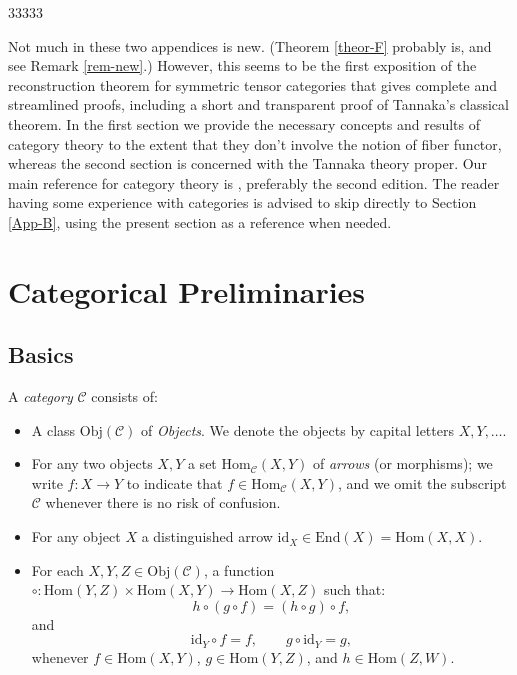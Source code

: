 \documentclass[11pt]{article}
\newcommand{\ip}[2]{\langle #1,#2\rangle}
\theoremstyle{definition}
\theoremstyle{definition}
\theoremstyle{remark}
\newcommand{\restr}{\upharpoonright}
\newcommand{\oli}{{\overline{\imath}}}
\newcommand{\DS}{\displaystyle}
\newcommand{\Obj}{\mathrm{Obj}}
\newcommand{\op}{{\mbox{\scriptsize op}}}
\newcommand{\impl}{\Rightarrow}
\newcommand{\ve}{\varepsilon}
\def\2#1{{\mathcal #1}}
\newcommand{\Hom}{\mathrm{Hom}}
\newcommand{\End}{\mathrm{End}}
\newcommand{\rarr}{\rightarrow}
\def\id{\mathrm{id}}
\begin{document}
\def\implies{\Rightarrow}
\renewcommand{\restr}{\upharpoonright}
\renewcommand{\rarr}{\rightarrow}
\newcommand{\lrarr}{\longrightarrow}
\renewcommand{\impl}{\Rightarrow}
\renewcommand{\oli}{{\overline{\imath}}}
\renewcommand{\ve}{\varepsilon}
\renewcommand{\op}{{\mbox{\scriptsize op}}}

\renewcommand{\DS}{\displaystyle}

\def\ip#1#2{{(\,#1\, , \, #2\,)}}
\def\m#1{{\vert #1 \vert}} \def\n#1{\Vert #1 \Vert}
\def\prf{\noindent \emph{Proof.\ }}

 33333

\vspace{2em} \noindent Not much in these two appendices
is new. (Theorem \ref{theor-F} probably is, and see
Remark \ref{rem-new}.) However, this seems to be the
first exposition of the reconstruction theorem for
symmetric tensor categories that gives complete and
streamlined proofs, including a short and transparent
proof of Tannaka's classical theorem. In the first
section we provide the necessary concepts and results
of category theory to the extent that they don't
involve the notion of fiber functor, whereas the second
section is concerned with the Tannaka theory
proper. Our main reference for category theory is
\cite{cwm}, preferably the second edition. The reader
having some experience with categories is advised to
skip directly to Section \ref{App-B}, using the present
section as a reference when needed.


\section{Categorical Preliminaries} \label{cats} \label{app-A}

\subsection{Basics}
\bdefin \label{def-cat} 
A \emph{category} $\2C$ consists of:
\begin{itemize}
\item A class $\Obj (\2C )$ of \emph{Objects}.  We
  denote the objects by capital letters $X,Y,\ldots$.
\item For any two objects $X,Y$ a set $\Hom_\2C(X,Y)$
  of \emph{arrows} (or morphisms); we write $f:X\to Y$
  to indicate that $f\in \Hom_\2C(X,Y)$, and we omit
  the subscript $\2C$ whenever there is no risk of
  confusion.
\item For any object $X$ a distinguished arrow $\id _X\in \End (X)=\Hom(X,X)$.
\item For each $X,Y,Z\in \Obj (\2C )$, a function
  $\circ :\Hom(Y,Z)\times \Hom(X,Y)\to \Hom (X,Z)$ such
  that:
  \[ h\circ (g\circ f)=(h\circ g)\circ f ,\] and
  \[ \id _Y\circ f=f ,\qquad g\circ \id _Y=g ,\] whenever $f\in \Hom
  (X,Y)$, $g\in \Hom (Y,Z)$, and $h\in \Hom (Z,W)$.
\end{itemize} \edefin
\end{document}
